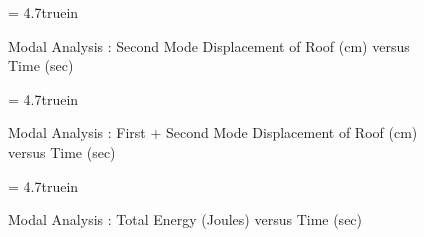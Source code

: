 \begin{figure}[h]
\epsfxsize= 4.7truein
\centerline{}
\caption{Modal Analysis : Second Mode Displacement of Roof (cm) versus Time (sec)}
\label{fig: modal-results-2}
\end{figure}

\clearpage
\begin{figure}[ht]
\epsfxsize= 4.7truein
\centerline{}
\caption{Modal Analysis : First + Second Mode Displacement of Roof (cm) versus Time (sec)}
\label{fig: modal-results-3}
\end{figure}

\begin{figure}[h]
\epsfxsize= 4.7truein
\centerline{}
\caption{Modal Analysis : Total Energy (Joules) versus Time (sec)}
\label{fig: modal-results-4}
\end{figure}
